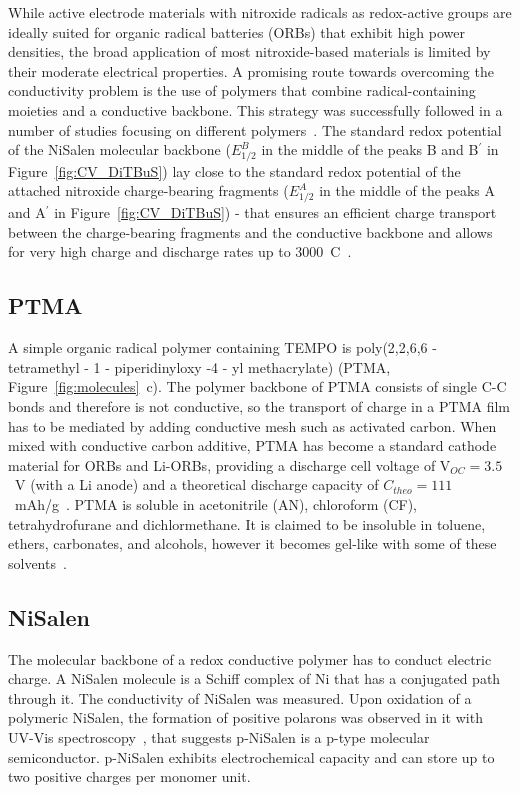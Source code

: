 \par
While active electrode materials with nitroxide radicals as redox-active groups are ideally suited for organic radical batteries (ORBs) that exhibit high power densities, the broad application of most nitroxide-based materials is limited by their moderate electrical properties. A promising route towards overcoming the conductivity problem is the use of polymers that combine radical-containing moieties and a conductive backbone. This strategy was successfully followed in a number of studies focusing on different polymers~\cite{oyaizu2015_polymerjournal, bahaceci2013_jpowersources, katsumata2006_mrc, xu2014_electact, aydin2015_jsoistatelect, schwartz2018_synthmet}. The standard redox potential of the NiSalen molecular backbone ($E_{1/2}^B$ in the middle of the peaks B and B$^\prime$ in Figure~\ref{fig:CV_DiTBuS}) lay close to the standard redox potential of the attached nitroxide charge-bearing fragments ($E_{1/2}^A$ in the middle of the peaks A and A$^\prime$ in Figure~\ref{fig:CV_DiTBuS}) - that ensures an efficient charge transport between the charge-bearing fragments and the conductive backbone and allows for very high charge and discharge rates up to 3000~C~\cite{Vereshchagin2020,Kulikov2022}.

\subsection{PTMA}
A simple organic radical polymer containing TEMPO is poly(2,2,6,6 - tetramethyl - 1 - piperidinyloxy -4 - yl methacrylate) (PTMA, Figure~\ref{fig:molecules}~c). The polymer backbone of PTMA consists of single C-C bonds and therefore is not conductive, so the transport of charge in a PTMA film has to be mediated by adding conductive mesh such as activated carbon. When mixed with conductive carbon additive, PTMA has become a standard cathode material for ORBs and Li-ORBs, providing a discharge cell voltage of V$_{OC}=3.5$~V (with a Li anode) and a theoretical discharge capacity of $C_{theo}=111$~mAh/g~\cite{Daniel2023_Multimodal}. PTMA is soluble in acetonitrile (AN), chloroform (CF), tetrahydrofurane and dichlormethane. It is claimed to be insoluble in toluene, ethers, carbonates, and alcohols, however it becomes gel-like with some of these solvents~\cite{DOM}.

\subsection{NiSalen}
The molecular backbone of a redox conductive polymer has to conduct electric charge. A NiSalen molecule is a Schiff complex of Ni that has a conjugated path through it. The conductivity of NiSalen was measured. Upon oxidation of a polymeric NiSalen, the formation of positive polarons was observed in it with UV-Vis spectroscopy~\cite{Dmitrieva2018}, that suggests p-NiSalen is a p-type molecular semiconductor. p-NiSalen exhibits electrochemical capacity and can store up to two positive charges per monomer unit.


